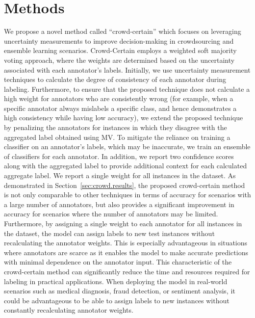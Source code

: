 \section{Methods}\label{sec:crowd.method}
We propose a novel method called ``crowd-certain'' which focuses on leveraging uncertainty measurements to improve decision-making in crowdsourcing and ensemble learning scenarios. Crowd-Certain employs a weighted soft majority voting approach, where the weights are determined based on the uncertainty associated with each annotator's labels. Initially, we use uncertainty measurement techniques to calculate the degree of consistency of each annotator during labeling. Furthermore, to ensure that the proposed technique does not calculate a high weight for annotators who are consistently wrong (for example, when a specific annotator always mislabels a specific class, and hence demonstrates a high consistency while having low accuracy), we extend the proposed technique by penalizing the annotators for instances in which they disagree with the aggregated label obtained using MV\@. To mitigate the reliance on training a classifier on an annotator's labels, which may be inaccurate, we train an ensemble of classifiers for each annotator. In addition, we report two confidence scores along with the aggregated label to provide additional context for each calculated aggregate label. We report a single weight for all instances in the dataset. As demonstrated in Section~\ref{sec:crowd.results}, the proposed crowd-certain method is not only comparable to other techniques in terms of accuracy for scenarios with a large number of annotators, but also provides a significant improvement in accuracy for scenarios where the number of annotators may be limited. Furthermore, by assigning a single weight to each annotator for all instances in the dataset, the model can assign labels to new test instances without recalculating the annotator weights. This is especially advantageous in situations where annotators are scarce as it enables the model to make accurate predictions with minimal dependence on the annotator input. This characteristic of the crowd-certain method can significantly reduce the time and resources required for labeling in practical applications. When deploying the model in real-world scenarios such as medical diagnosis, fraud detection, or sentiment analysis, it could be advantageous to be able to assign labels to new instances without constantly recalculating annotator weights.
